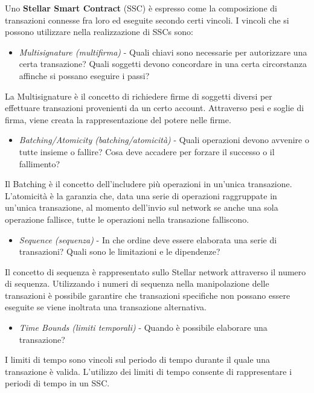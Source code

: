Uno \textbf{Stellar Smart Contract} (SSC) è espresso come la composizione
di transazioni connesse fra loro ed eseguite secondo certi vincoli.
I vincoli che si possono utilizzare nella realizzazione di SSCs sono:

\begin{itemize}
	\item \textit{Multisignature (multifirma)} - Quali chiavi sono necessarie
	      per autorizzare
	      una certa transazione? Quali soggetti devono concordare in una certa
	      circorstanza affinche si possano eseguire i passi?
\end{itemize}
La Multisignature è il concetto di richiedere firme di soggetti diversi per
effettuare transazioni provenienti da un certo account.
Attraverso pesi e soglie di firma,
viene creata la rappresentazione del potere nelle firme.

\begin{itemize}
	\item \textit{Batching/Atomicity (batching/atomicità)} -
	      Quali operazioni devono avvenire
	      o tutte insieme o fallire?
	      Cosa deve accadere per forzare il successo o il fallimento?
\end{itemize}
Il Batching è il concetto dell'includere più operazioni in un'unica transazione.
L'atomicità è la garanzia che, data una serie di operazioni raggruppate in
un'unica transazione,
al momento dell'invio sul network se anche una sola operazione fallisce,
tutte le operazioni nella transazione falliscono.

\begin{itemize}
	\item \textit{Sequence (sequenza)} -
	      In che ordine deve essere elaborata una serie di transazioni?
	      Quali sono le limitazioni e le dipendenze?
\end{itemize}
Il concetto di sequenza è rappresentato sullo Stellar network attraverso
il numero di sequenza. Utilizzando i numeri di sequenza
nella manipolazione delle transazioni è possibile garantire che
transazioni specifiche non possano essere eseguite
se viene inoltrata una transazione alternativa.

\begin{itemize}
	\item \textit{Time Bounds (limiti temporali)} -
	      Quando è possibile elaborare una transazione?
\end{itemize}
I limiti di tempo sono vincoli sul periodo di tempo durante il quale
una transazione è valida. L'utilizzo dei limiti di tempo
consente di rappresentare i periodi di tempo in un SSC.

